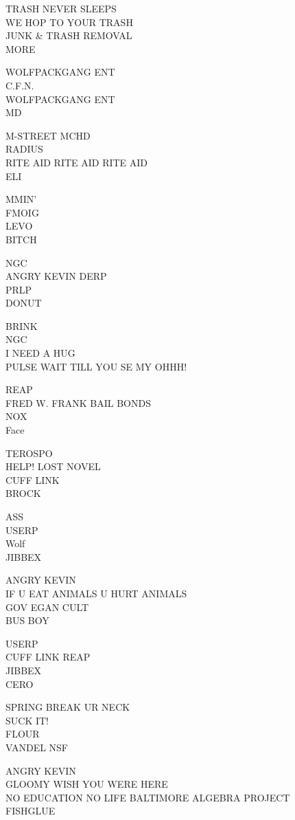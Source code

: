 \documentclass[10pt,letterpaper]{article}
\begin{document}
TRASH NEVER SLEEPS\\
WE HOP TO YOUR TRASH\\
JUNK \& TRASH REMOVAL\\
MORE

WOLFPACKGANG ENT\\
C.F.N.\\
WOLFPACKGANG ENT\\
MD

M{-}STREET MCHD\\
RADIUS\\
RITE AID RITE AID RITE AID\\
ELI

MMIN'\\
FMOIG\\
LEVO\\
BITCH

NGC\\
ANGRY KEVIN DERP\\
PRLP\\
DONUT

BRINK\\
NGC\\
I NEED A HUG\\
PULSE WAIT TILL YOU SE MY OHHH!

REAP\\
FRED W. FRANK BAIL BONDS\\
NOX\\
Face

TEROSPO\\
HELP!  LOST NOVEL\\
CUFF LINK\\
BROCK

ASS\\
USERP\\
Wolf\\
JIBBEX

ANGRY KEVIN\\
IF U EAT ANIMALS U HURT ANIMALS\\
GOV EGAN CULT\\
BUS BOY

USERP\\
CUFF LINK REAP\\
JIBBEX\\
CERO

SPRING BREAK UR NECK\\
SUCK IT!\\
FLOUR\\
VANDEL NSF

ANGRY KEVIN\\
GLOOMY WISH YOU WERE HERE\\
NO EDUCATION NO LIFE BALTIMORE ALGEBRA PROJECT\\
FISHGLUE
\end{document}
